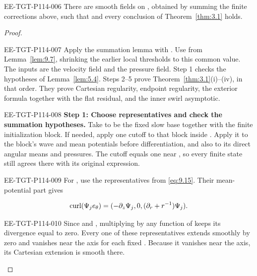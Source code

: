 \begin{proposition}\label{prop:9.9}
\begin{EESegment}{EE-TGT-P114-006}
There are smooth fields  on
, obtained by summing the finite corrections above, such that
 and every conclusion of
Theorem~\ref{thm:3.1} holds.
\end{EESegment}
\end{proposition}

\begin{proof}
\begin{EESegment}{EE-TGT-P114-007}
Apply the summation lemma with
. Use
 from Lemma~\ref{lem:9.7}, shrinking the earlier local
thresholds to this common value. The inputs are the velocity field and the pressure field. Step 1
checks the hypotheses of Lemma~\ref{lem:5.4}. Steps 2--5 prove
Theorem~\ref{thm:3.1}(i)--(iv), in that order. They prove Cartesian regularity, endpoint
regularity, the exterior formula together with the flat residual, and the inner swirl asymptotic.
\end{EESegment}

\begin{EESegment}{EE-TGT-P114-008}
\noindent\textbf{Step 1: Choose representatives and check the summation hypotheses.} Take
 to be the fixed slow base together with the finite initialization block.
If needed, apply one cutoff to that block inside . Apply it
to the block's wave and mean potentials before differentiation, and also to its direct angular means
and pressures. The cutoff equals one near , so every finite state still
agrees there with its original expression.
\end{EESegment}

\begin{EESegment}{EE-TGT-P114-009}
For , use the representatives
 from \eqref{eq:9.15}. Their mean-potential part gives
\end{EESegment}
\[
\operatorname{curl}(\Psi_je_\theta)=(-\partial_z\Psi_j,0,(\partial_r+r^{-1})\Psi_j).
\]
\begin{EESegment}{EE-TGT-P114-010}
Since  and
, multiplying  by any
function of  keeps its divergence equal to zero. Every one of these
representatives extends smoothly by zero and vanishes near the axis for each fixed
. Because it vanishes near the axis, its Cartesian extension is smooth
there.
\end{EESegment}


\end{proof}
